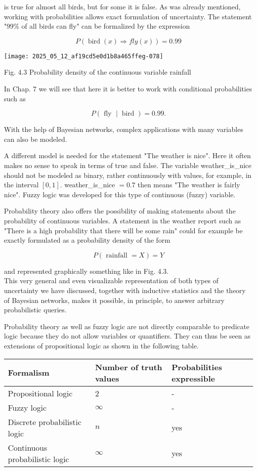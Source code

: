 \documentclass[10pt]{article}
\begin{document}
is true for almost all birds, but for some it is false. As was already mentioned, working with probabilities allows exact formulation of uncertainty. The statement "99\% of all birds can fly" can be formalized by the expression

$$
P(\operatorname{bird}(x) \Rightarrow f l y(x))=0.99
$$

\begin{center}
\texttt{[image: 2025\_05\_12\_af19cd5e0d1b8a465ffeg-078]}
\end{center}

Fig. 4.3 Probability density of the continuous variable rainfall

In Chap. 7 we will see that here it is better to work with conditional probabilities such as

$$
P(\text { fly } \mid \text { bird })=0.99 .
$$

With the help of Bayesian networks, complex applications with many variables can also be modeled.

A different model is needed for the statement "The weather is nice". Here it often makes no sense to speak in terms of true and false. The variable weather\_is\_nice should not be modeled as binary, rather continuously with values, for example, in the interval $[0,1]$. weather\_is\_nice $=0.7$ then means "The weather is fairly nice". Fuzzy logic was developed for this type of continuous (fuzzy) variable.

Probability theory also offers the possibility of making statements about the probability of continuous variables. A statement in the weather report such as "There is a high probability that there will be some rain" could for example be exactly formulated as a probability density of the form

$$
P(\text { rainfall }=X)=Y
$$

and represented graphically something like in Fig. 4.3.\\
This very general and even visualizable representation of both types of uncertainty we have discussed, together with inductive statistics and the theory of Bayesian networks, makes it possible, in principle, to answer arbitrary probabilistic queries.

Probability theory as well as fuzzy logic are not directly comparable to predicate logic because they do not allow variables or quantifiers. They can thus be seen as extensions of propositional logic as shown in the following table.

\begin{center}
\begin{tabular}{|l|l|l|}
\hline
Formalism & Number of truth values & Probabilities expressible \\
\hline
Propositional logic & 2 & - \\
\hline
Fuzzy logic & $\infty$ & - \\
\hline
Discrete probabilistic logic & $n$ & yes \\
\hline
Continuous probabilistic logic & $\infty$ & yes \\
\hline
\end{tabular}
\end{center}
\end{document}
